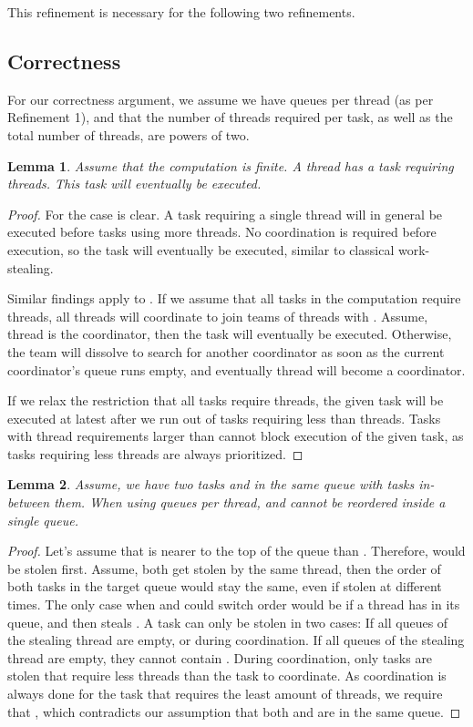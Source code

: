 \documentclass[preprint]{sigplanconf}
\newtheorem{lem}{Lemma}
\begin{document}
This refinement is necessary for the following two refinements.

\subsection{Correctness}

For our correctness argument, we assume we have  queues per
thread (as per Refinement 1), and that the number of threads required
per task, as well as the total number of threads, are powers of two.

\begin{lem} 
Assume that the computation is finite. A thread  has a task
requiring  threads. This task will eventually be executed.
\end{lem}

\begin{proof}
For  the case is clear. A task requiring a single thread will in
general be executed before tasks using more threads. No coordination
is required before execution, so the task will eventually be executed,
similar to classical work-stealing.

Similar findings apply to . If we assume that all tasks in the
computation require  threads, all threads will coordinate to join
teams of  threads with . Assume, thread  is
the coordinator, then the task will eventually be executed. Otherwise,
the team will dissolve to search for another coordinator as soon as
the current coordinator's queue runs empty, and eventually thread 
will become a coordinator.

If we relax the restriction that all tasks require  threads, the
given task will be executed at latest after we run out of tasks
requiring less than  threads. Tasks with thread requirements larger
than  cannot block execution of the given task, as tasks requiring
less threads are always prioritized.
\end{proof}

\begin{lem}
Assume, we have two tasks  and  in the same queue with 
tasks in-between them. When using  queues per thread,  and
 cannot be reordered inside a single queue.
\end{lem}

\begin{proof}
Let's assume that  is nearer to the top of the queue than
. Therefore,  would be stolen first. Assume, both get stolen by
the same thread, then the order of both tasks in the target queue
would stay the same, even if stolen at different times. The only case
when  and  could switch order would be if a thread has  in
its queue, and then steals . A task can only be stolen in two
cases: If all queues of the stealing thread are empty, or during
coordination. If all queues of the stealing thread are empty, they
cannot contain . During coordination, only tasks are stolen that
require less threads than the task to coordinate. As coordination is
always done for the task that requires the least amount of threads, we
require that , which contradicts our assumption that both
 and  are in the same queue.
\end{proof}
\end{document}
